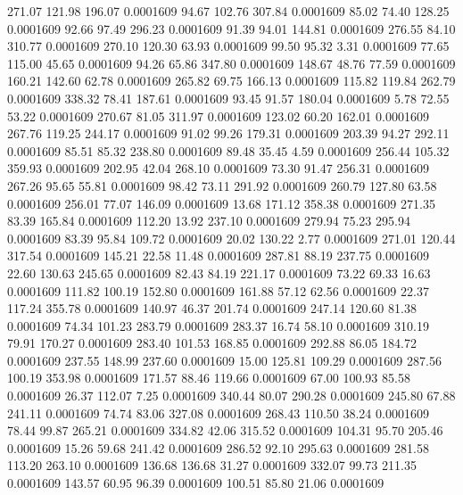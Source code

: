  271.07  121.98  196.07   0.0001609
  94.67  102.76  307.84   0.0001609
  85.02   74.40  128.25   0.0001609
  92.66   97.49  296.23   0.0001609
  91.39   94.01  144.81   0.0001609
 276.55   84.10  310.77   0.0001609
 270.10  120.30   63.93   0.0001609
  99.50   95.32    3.31   0.0001609
  77.65  115.00   45.65   0.0001609
  94.26   65.86  347.80   0.0001609
 148.67   48.76   77.59   0.0001609
 160.21  142.60   62.78   0.0001609
 265.82   69.75  166.13   0.0001609
 115.82  119.84  262.79   0.0001609
 338.32   78.41  187.61   0.0001609
  93.45   91.57  180.04   0.0001609
   5.78   72.55   53.22   0.0001609
 270.67   81.05  311.97   0.0001609
 123.02   60.20  162.01   0.0001609
 267.76  119.25  244.17   0.0001609
  91.02   99.26  179.31   0.0001609
 203.39   94.27  292.11   0.0001609
  85.51   85.32  238.80   0.0001609
  89.48   35.45    4.59   0.0001609
 256.44  105.32  359.93   0.0001609
 202.95   42.04  268.10   0.0001609
  73.30   91.47  256.31   0.0001609
 267.26   95.65   55.81   0.0001609
  98.42   73.11  291.92   0.0001609
 260.79  127.80   63.58   0.0001609
 256.01   77.07  146.09   0.0001609
  13.68  171.12  358.38   0.0001609
 271.35   83.39  165.84   0.0001609
 112.20   13.92  237.10   0.0001609
 279.94   75.23  295.94   0.0001609
  83.39   95.84  109.72   0.0001609
  20.02  130.22    2.77   0.0001609
 271.01  120.44  317.54   0.0001609
 145.21   22.58   11.48   0.0001609
 287.81   88.19  237.75   0.0001609
  22.60  130.63  245.65   0.0001609
  82.43   84.19  221.17   0.0001609
  73.22   69.33   16.63   0.0001609
 111.82  100.19  152.80   0.0001609
 161.88   57.12   62.56   0.0001609
  22.37  117.24  355.78   0.0001609
 140.97   46.37  201.74   0.0001609
 247.14  120.60   81.38   0.0001609
  74.34  101.23  283.79   0.0001609
 283.37   16.74   58.10   0.0001609
 310.19   79.91  170.27   0.0001609
 283.40  101.53  168.85   0.0001609
 292.88   86.05  184.72   0.0001609
 237.55  148.99  237.60   0.0001609
  15.00  125.81  109.29   0.0001609
 287.56  100.19  353.98   0.0001609
 171.57   88.46  119.66   0.0001609
  67.00  100.93   85.58   0.0001609
  26.37  112.07    7.25   0.0001609
 340.44   80.07  290.28   0.0001609
 245.80   67.88  241.11   0.0001609
  74.74   83.06  327.08   0.0001609
 268.43  110.50   38.24   0.0001609
  78.44   99.87  265.21   0.0001609
 334.82   42.06  315.52   0.0001609
 104.31   95.70  205.46   0.0001609
  15.26   59.68  241.42   0.0001609
 286.52   92.10  295.63   0.0001609
 281.58  113.20  263.10   0.0001609
 136.68  136.68   31.27   0.0001609
 332.07   99.73  211.35   0.0001609
 143.57   60.95   96.39   0.0001609
 100.51   85.80   21.06   0.0001609

